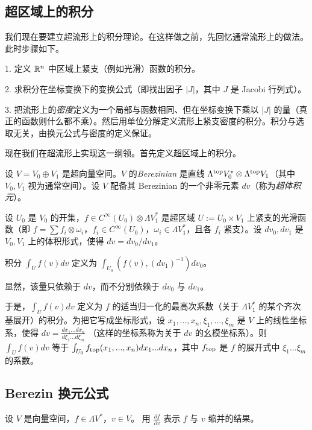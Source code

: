 \subsection{超区域上的积分}

我们现在要建立超流形上的积分理论。在这样做之前，先回忆通常流形上的做法。此时步骤如下。

1. 定义 $\Bbb R^n$ 中区域上紧支（例如光滑）函数的积分。

2. 求积分在坐标变换下的变换公式（即找出因子 $|J|$，其中 $J$ 是 Jacobi 行列式）。

3. 把流形上的\emph{密度}定义为一个局部与函数相同、但在坐标变换下乘以 $|J|$ 的量（真正的函数则什么都不乘）。然后用单位分解定义流形上紧支密度的积分。积分与选取无关，由换元公式与密度的定义保证。

现在我们在超流形上实现这一纲领。首先定义超区域上的积分。

设 $V=V_0\oplus V_1$ 是超向量空间。$V$ 的\emph{Berezinian} 是直线 $\Lambda^{\rm top}V_0^*
\otimes \Lambda^{\rm top}V_1$（其中 $V_0,V_1$ 视为通常空间）。设 $V$ 配备其 Berezinian 的一个非零元素 $dv$（称为\emph{超体积元}）。

设 $U_0$ 是 $V_0$ 的开集，$f\in C^\infty(U_0)\otimes
\Lambda V_1^*$ 是超区域 $U:=U_0\times V_1$ 上紧支的光滑函数（即
$f=\sum f_i\otimes \omega_i$，$f_i\in C^\infty(U_0)$，$\omega_i\in
\Lambda V_1^*$，且各 $f_i$ 紧支）。设 $dv_0,dv_1$ 是 $V_0,V_1$ 上的体积形式，使得
$dv=dv_0/dv_1$。

\begin{definition} 积分 $\int_U f(v)dv$
定义为 $\int_{U_0}(f(v),(dv_1)^{-1})dv_0$。
\end{definition}

显然，该量只依赖于 $dv$，而不分别依赖于 $dv_0$ 与 $dv_1$。

于是，$\int_U f(v)dv$ 定义为 $f$ 的适当归一化的最高次系数（关于 $\Lambda V_1^*$ 的某个齐次基展开）的积分。为把它写成坐标形式，设 $x_1,...,x_n,\xi_1,...,\xi_m$ 是 $V$ 上的线性坐标系，使得
$dv=\frac{dx_1...dx_n}{d\xi_1...d\xi_m}$
（这样的坐标系称为关于 $dv$ 的幺模坐标系）。则
$\int_U f(v)dv$ 等于 $\int_{U_0} f_{\rm top}(x_1,...,x_n)dx_1...dx_n$，其中
$f_{\rm top}$ 是 $f$ 的展开式中 $\xi_1...\xi_m$ 的系数。

\subsection{Berezin 换元公式}

设 $V$ 是向量空间，$f\in \Lambda V^*$，$v\in V$。
用 $\frac{\partial f}{\partial v}$ 表示 $f$ 与 $v$ 缩并的结果。


